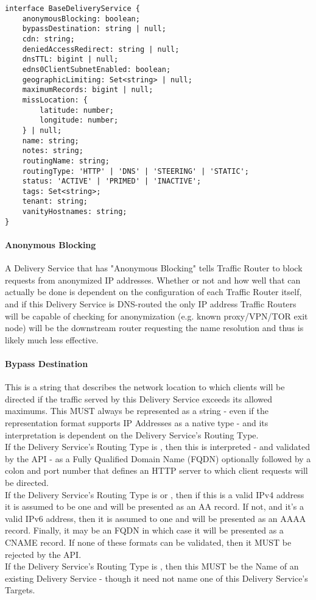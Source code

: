 \begin{codelisting}
\begin{verbatim}
interface BaseDeliveryService {
	anonymousBlocking: boolean;
	bypassDestination: string | null;
	cdn: string;
	deniedAccessRedirect: string | null;
	dnsTTL: bigint | null;
	edns0ClientSubnetEnabled: boolean;
	geographicLimiting: Set<string> | null;
	maximumRecords: bigint | null;
	missLocation: {
		latitude: number;
		longitude: number;
	} | null;
	name: string;
	notes: string;
	routingName: string;
	routingType: 'HTTP' | 'DNS' | 'STEERING' | 'STATIC';
	status: 'ACTIVE' | 'PRIMED' | 'INACTIVE';
	tags: Set<string>;
	tenant: string;
	vanityHostnames: string;
}
\end{verbatim}
\end{codelisting}

\paragraph{Anonymous Blocking}
A Delivery Service that has "Anonymous Blocking" tells Traffic Router to block
requests from anonymized IP addresses. Whether or not and how well that can
actually be done is dependent on the configuration of each Traffic Router
itself, and if this Delivery Service is DNS-routed the only IP address Traffic
Routers will be capable of checking for anonymization (e.g. known proxy/VPN/TOR
exit node) will be the downstream router requesting the name resolution and thus
is likely much less effective.

\paragraph{Bypass Destination}
This is a string that describes the network location to which clients will be
directed if the traffic served by this Delivery Service exceeds its allowed
maximums. This MUST always be represented as a string - even if the
representation format supports IP Addresses as a native type - and its
interpretation is dependent on the Delivery Service's Routing Type.\\
If the Delivery Service's Routing Type is , then this is interpreted
- and validated by the API - as a Fully Qualified Domain Name (FQDN) optionally
followed by a colon and port number that defines an HTTP server to which client
requests will be directed.\\
If the Delivery Service's Routing Type is  or , then if
this is a valid IPv4 address it is assumed to be one and will be presented as an
AA record. If not, and it's a valid IPv6 address, then it is assumed to one and
will be presented as an AAAA record. Finally, it may be an FQDN in which case it
will be presented as a CNAME record. If none of these formats can be validated,
then it MUST be rejected by the API.\\
If the Delivery Service's Routing Type is , then this MUST be the
Name of an existing Delivery Service - though it need not name one of this
Delivery Service's Targets.

